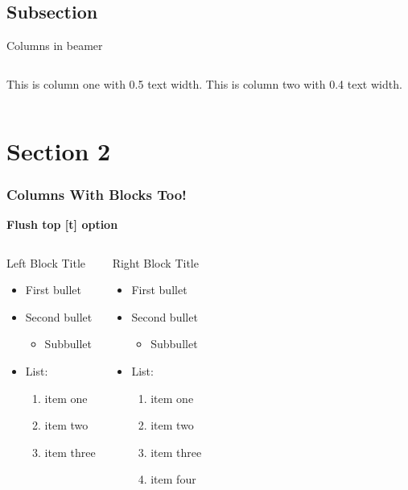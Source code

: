 \documentclass[aspectratio=1610]{beamer}
\begin{document}
\subsection{Subsection}
\begin{frame}{Columns in beamer}
    \begin{columns}
        \centering
        This is column one with 0.5 text width.
        \centering
        This is column two with 0.4 text width.
    \end{columns}
\end{frame}



\section{Section 2}
\begin{frame}[t]
  \frametitle{Columns With Blocks Too!}

  \textbf{Flush top [t] option}

  \begin{columns}[t]
    \begin{block}{Left Block Title}
    \begin{itemize}
    \item First bullet
    \item Second bullet
      \begin{itemize}
      \item Subbullet
      \end{itemize}
    \item List:
      \begin{enumerate}
      \item item one
      \item item two
      \item item three
      \end{enumerate}
    \end{itemize}
    \end{block}
    \begin{block}{Right Block Title}
    \begin{itemize}
    \item First bullet
    \item Second bullet
      \begin{itemize}
      \item Subbullet
      \end{itemize}
    \item List:
      \begin{enumerate}
      \item item one
      \item item two
      \item item three
      \item item four
      \end{enumerate}
    \end{itemize}
    \end{block}
  \end{columns}
\end{frame}
\end{document}
